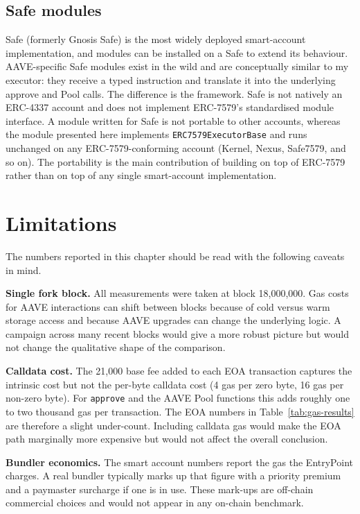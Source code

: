 \subsection{Safe modules}

Safe (formerly Gnosis Safe) is the most widely deployed smart-account
implementation, and modules can be installed on a Safe to extend its
behaviour. AAVE-specific Safe modules exist in the wild and are conceptually
similar to my executor: they receive a typed instruction and translate it
into the underlying approve and Pool calls. The difference is the framework.
Safe is not natively an ERC-4337 account and does not implement
ERC-7579's standardised module interface. A module written for Safe is not
portable to other accounts, whereas the module presented here implements
\texttt{ERC7579ExecutorBase} and runs unchanged on any ERC-7579-conforming
account (Kernel, Nexus, Safe7579, and so on). The portability is the main
contribution of building on top of ERC-7579 rather than on top of any single
smart-account implementation.

\section{Limitations}

The numbers reported in this chapter should be read with the following
caveats in mind.

\textbf{Single fork block.} All measurements were taken at block 18,000,000.
Gas costs for AAVE interactions can shift between blocks because of cold
versus warm storage access and because AAVE upgrades can change the
underlying logic. A campaign across many recent blocks would give a more
robust picture but would not change the qualitative shape of the comparison.

\textbf{Calldata cost.} The 21{,}000 base fee added to each EOA transaction
captures the intrinsic cost but not the per-byte calldata cost (4 gas per
zero byte, 16 gas per non-zero byte). For \texttt{approve} and the AAVE Pool
functions this adds roughly one to two thousand gas per transaction. The
EOA numbers in Table~\ref{tab:gas-results} are therefore a slight
under-count. Including calldata gas would make the EOA path marginally more
expensive but would not affect the overall conclusion.

\textbf{Bundler economics.} The smart account numbers report the gas the
EntryPoint charges. A real bundler typically marks up that figure with a
priority premium and a paymaster surcharge if one is in use. These mark-ups
are off-chain commercial choices and would not appear in any on-chain
benchmark.

